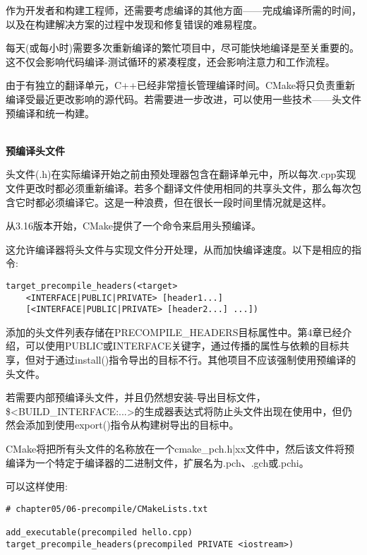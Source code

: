 
作为开发者和构建工程师，还需要考虑编译的其他方面——完成编译所需的时间，以及在构建解决方案的过程中发现和修复错误的难易程度。


每天(或每小时)需要多次重新编译的繁忙项目中，尽可能快地编译是至关重要的。这不仅会影响代码编译-测试循环的紧凑程度，还会影响注意力和工作流程。

由于有独立的翻译单元，C++已经非常擅长管理编译时间。CMake将只负责重新编译受最近更改影响的源代码。若需要进一步改进，可以使用一些技术——头文件预编译和统一构建。

\hspace*{\fill} \\ %
\noindent
\textbf{预编译头文件}

头文件(.h)在实际编译开始之前由预处理器包含在翻译单元中，所以每次.cpp实现文件更改时都必须重新编译。若多个翻译文件使用相同的共享头文件，那么每次包含它时都必须编译它。这是一种浪费，但在很长一段时间里情况就是这样。

从3.16版本开始，CMake提供了一个命令来启用头预编译。

这允许编译器将头文件与实现文件分开处理，从而加快编译速度。以下是相应的指令:

\begin{lstlisting}[style=styleCMake]
target_precompile_headers(<target>
	<INTERFACE|PUBLIC|PRIVATE> [header1...]
	[<INTERFACE|PUBLIC|PRIVATE> [header2...] ...])
\end{lstlisting}

添加的头文件列表存储在PRECOMPILE\_HEADERS目标属性中。第4章已经介绍，可以使用PUBLIC或INTERFACE关键字，通过传播的属性与依赖的目标共享，但对于通过install()指令导出的目标不行。其他项目不应该强制使用预编译的头文件。

\begin{tcolorbox}[colback=blue!5!white,colframe=blue!75!black,title=重要的Note]
若需要内部预编译头文件，并且仍然想安装-导出目标文件，\$<BUILD\_INTERFACE:...>的生成器表达式将防止头文件出现在使用中，但仍然会添加到使用export()指令从构建树导出的目标中。
\end{tcolorbox}

CMake将把所有头文件的名称放在一个cmake\_pch.h|xx文件中，然后该文件将预编译为一个特定于编译器的二进制文件，扩展名为.pch、.gch或.pchi。

可以这样使用:

\begin{lstlisting}[style=styleCMake]
# chapter05/06-precompile/CMakeLists.txt

add_executable(precompiled hello.cpp)
target_precompile_headers(precompiled PRIVATE <iostream>)
\end{lstlisting}


